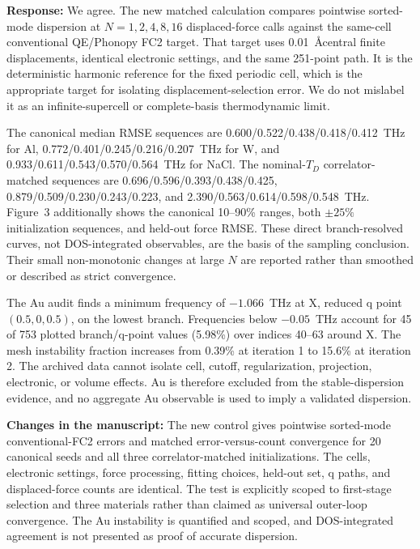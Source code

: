 \documentclass[11pt]{article}
\newcommand{\Answer}[1]{\par\noindent\color{black}\normalfont\textbf{Response:} #1\par\smallskip}
\newcommand{\Change}[1]{\par\noindent\color{revisionblue}\normalfont\textbf{Changes in the manuscript:} #1\par\color{black}\medskip}
\begin{document}
\Answer{We agree. The new matched calculation compares pointwise sorted-mode
dispersion at $N=1,2,4,8,16$ displaced-force calls against the same-cell
conventional QE/Phonopy FC2 target. That target uses 0.01~\AA central finite
displacements, identical electronic settings, and the same 251-point path. It
is the deterministic harmonic reference for the fixed periodic cell, which is
the appropriate target for isolating displacement-selection error. We do not
mislabel it as an infinite-supercell or complete-basis thermodynamic limit.

The canonical median RMSE sequences are
0.600/0.522/0.438/0.418/0.412~THz for Al,
0.772/0.401/0.245/0.216/0.207~THz for W, and
0.933/0.611/0.543/0.570/0.564~THz for NaCl. The nominal-$T_D$
correlator-matched sequences are 0.696/0.596/0.393/0.438/0.425,
0.879/0.509/0.230/0.243/0.223, and
2.390/0.563/0.614/0.598/0.548~THz. Figure~3 additionally shows the canonical
10--90\% ranges, both $\pm25\%$ initialization sequences, and held-out force
RMSE. These direct branch-resolved curves, not DOS-integrated observables, are
the basis of the sampling conclusion. Their small non-monotonic changes at
large $N$ are reported rather than smoothed or described as strict convergence.

The Au audit finds a minimum frequency of $-1.066$~THz at X, reduced q point
$(0.5,0,0.5)$, on the lowest branch. Frequencies below $-0.05$~THz account for
45 of 753 plotted branch/q-point values (5.98\%) over indices 40--63 around X.
The mesh instability fraction increases from 0.39\% at iteration 1 to 15.6\%
at iteration 2. The archived data cannot isolate cell, cutoff, regularization,
projection, electronic, or volume effects. Au is therefore excluded from the
stable-dispersion evidence, and no aggregate Au observable is used to imply a
validated dispersion.}

\Change{The new control gives pointwise sorted-mode conventional-FC2 errors
and matched error-versus-count convergence for 20 canonical seeds and all three
correlator-matched initializations. The cells, electronic settings, force
processing, fitting choices, held-out set, q paths, and displaced-force counts
are identical. The test is explicitly scoped to first-stage selection and
three materials rather than claimed as universal outer-loop convergence. The
Au instability is quantified and scoped, and DOS-integrated agreement is not
presented as proof of accurate dispersion.}
\end{document}
